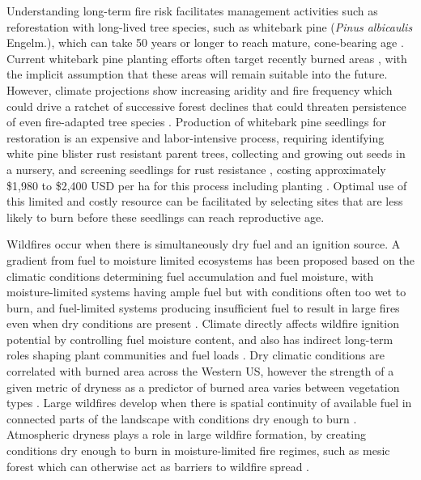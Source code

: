 \documentclass[11p]{article}
\begin{document}
Understanding long-term fire risk facilitates management activities such as reforestation with long-lived tree species, such as whitebark pine (\textit{Pinus albicaulis} Engelm.), which can take 50 years or longer to reach mature, cone-bearing age \citep{tombackWhitebarkPineCommunities2001}. Current whitebark pine planting efforts often target recently burned areas \citep{keaneRangewideRestorationStrategy2012}, with the implicit assumption that these areas will remain suitable into the future. However, climate projections show increasing aridity and fire frequency which could drive a ratchet \citep{jacksonEcologyRatchetEvents2009} of successive forest declines that could threaten persistence of even fire-adapted tree species \citep{turnerMagnitudeDirectionTempo2022}. Production of whitebark pine seedlings for restoration is an expensive and labor-intensive process, requiring identifying white pine blister rust resistant parent trees, collecting and growing out seeds in a nursery, and screening seedlings for rust resistance \citep{tombackTammReviewCurrent2022}, costing approximately \$1,980 to \$2,400 USD per ha for this process including planting \citep{tombackMagnificentHighElevationFiveNeedle2011}. Optimal use of this limited and costly resource can be facilitated by selecting sites that are less likely to burn before these seedlings can reach reproductive age.

Wildfires occur when there is simultaneously dry fuel and an ignition source. A gradient from fuel to moisture limited ecosystems has been proposed based on the climatic conditions determining fuel accumulation and fuel moisture, with moisture-limited systems having ample fuel but with conditions often too wet to burn, and fuel-limited systems producing insufficient fuel to result in large fires even when dry conditions are present \citep{meynEnvironmentalDriversLarge2007,littellClimateChangeFuture2018}. Climate directly affects wildfire ignition potential by controlling fuel moisture content, and also has indirect long-term roles shaping plant communities and fuel loads \citep{littellReviewRelationshipsDrought2016}. Dry climatic conditions are correlated with burned area across the Western US, however the strength of a given metric of dryness as a predictor of burned area varies between vegetation types \citep{littellClimateWildfireArea2009,littellClimateChangeFuture2018}. Large wildfires develop when there is spatial continuity of available fuel in connected parts of the landscape with conditions dry enough to burn %
\citep{millerConnectivityForestFuels2000}. Atmospheric dryness plays a role in large wildfire formation, by creating conditions dry enough to burn in moisture-limited fire regimes, such as mesic forest which can otherwise act as barriers to wildfire spread \citep{cawsonAtmosphericDrynessRemoves2024}. 
\end{document}
